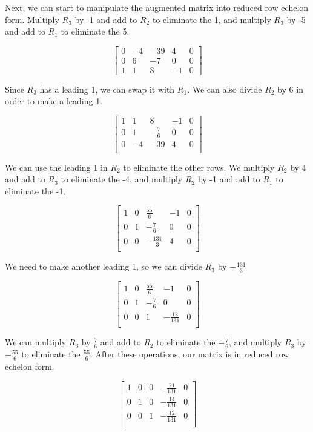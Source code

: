 \documentclass[11pt, letterpaper, twoside]{article}
\begin{document}
\begin{enumerate}
\begin{enumerate}[label=(\alph*)]
Next, we can start to manipulate the augmented matrix into reduced row echelon form. Multiply $R_3$ by -1 and add to $R_2$ to eliminate the 1, and multiply $R_3$ by -5 and add to $R_1$ to eliminate the 5.

$$\begin{bmatrix}
0 & -4 & -39 & 4 & 0\\
0 & 6 & -7 & 0 & 0\\
1 & 1 & 8 & -1 & 0
\end{bmatrix}$$

Since $R_3$ has a leading 1, we can swap it with $R_1$. We can also divide $R_2$ by 6 in order to make a leading 1.

$$\begin{bmatrix}
1 & 1 & 8 & -1 & 0\\
0 & 1 & -\frac{7}{6} & 0 & 0\\
0 & -4 & -39 & 4 & 0\\
\end{bmatrix}$$

We can use the leading 1 in $R_2$ to eliminate the other rows. We multiply $R_2$ by 4 and add to $R_3$ to eliminate the -4, and multiply $R_2$ by -1 and add to $R_1$ to eliminate the -1.

$$\begin{bmatrix}
1 & 0 & \frac{55}{6} & -1 & 0\\
0 & 1 & -\frac{7}{6} & 0 & 0\\
0 & 0 & -\frac{131}{3} & 4 & 0\\
\end{bmatrix}$$

We need to make another leading 1, so we can divide $R_3$ by $-\frac{131}{3}$

$$\begin{bmatrix}
1 & 0 & \frac{55}{6} & -1 & 0\\
0 & 1 & -\frac{7}{6} & 0 & 0\\
0 & 0 & 1 & -\frac{12}{131} & 0\\
\end{bmatrix}$$

We can multiply $R_3$ by $\frac{7}{6}$ and add to $R_2$ to eliminate the $-\frac{7}{6}$, and multiply $R_3$ by $-\frac{55}{6}$ to eliminate the $\frac{55}{6}$. After these operations, our matrix is in reduced row echelon form.

$$\begin{bmatrix}
1 & 0 & 0 & -\frac{21}{131} & 0\\
0 & 1 & 0 & -\frac{14}{131} & 0\\
0 & 0 & 1 & -\frac{12}{131} & 0\\
\end{bmatrix}$$


\end{enumerate}
\end{enumerate}
\end{document}
